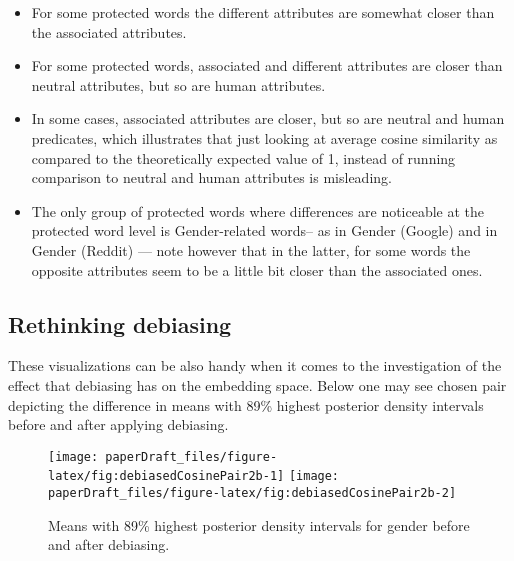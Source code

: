 \documentclass[
  12pt,
  dvipsnames,enabledeprecatedfontcommands]{scrartcl}
\begin{document}
\begin{itemize}
\item
  For some protected words the different attributes are somewhat closer
  than the associated attributes.
\item
  For some protected words, associated and different attributes are
  closer than neutral attributes, but so are human attributes.
\item
  In some cases, associated attributes are closer, but so are neutral
  and human predicates, which illustrates that just looking at average
  cosine similarity as compared to the theoretically expected value of
  1, instead of running comparison to neutral and human attributes is
  misleading.
\item
  The only group of protected words where differences are noticeable at
  the protected word level is Gender-related words-- as in Gender
  (Google) and in Gender (Reddit) --- note however that in the latter,
  for some words the opposite attributes seem to be a little bit closer
  than the associated ones.
\end{itemize}

\hypertarget{rethinking-debiasing}{%
\subsection{Rethinking debiasing}\label{rethinking-debiasing}}

These visualizations can be also handy when it comes to the
investigation of the effect that debiasing has on the embedding space.
Below one may see chosen pair depicting the difference in means with
89\% highest posterior density intervals before and after applying
debiasing.

\begin{figure}[H]

\begin{center}\texttt{[image: paperDraft\_files/figure-latex/fig:debiasedCosinePair2b-1]} \texttt{[image: paperDraft\_files/figure-latex/fig:debiasedCosinePair2b-2]} \end{center}
\caption{Means with 89\% highest posterior density intervals for gender before and after debiasing.}
\label{fig:empiricalDebiasedPair}
\end{figure}
\end{document}
